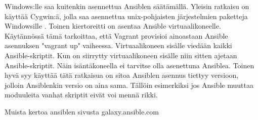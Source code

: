 Windows:lle saa kuitenkin asennettua Ansiblen säätämällä. Yleisin ratkaisu on käyttää Cygwin:ä, jolla saa asennettua unix-pohjaisten järjestelmien paketteja Windowsille \cite{link:cygwin}. Toinen kiertoreitti on asentaa Ansible virtuaalikoneelle. Käytännössä tämä tarkoittaa, että Vagrant provisioi ainoastaan Ansible asennuksen "vagrant up" vaiheessa. Virtuaalikoneen sisälle viedään kaikki Ansible-skriptit. Kun on siirrytty virtuaalikoneen sisälle niin sitten ajetaan Ansible-skriptit. Näin isäntäkoneella ei tarvitse olla asenettuna Ansiblea. Toinen hyvä syy käyttää tätä ratkaisua on sitoa Ansiblen asennus tiettyy versioon, jolloin Ansiblenkin versio on aina sama. Tällöin esimerkiksi jos Ansible muuttaa moduuleita vanhat skriptit eivät voi mennä rikki.

Muista kertoa ansiblen sivusta galaxy.ansible.com